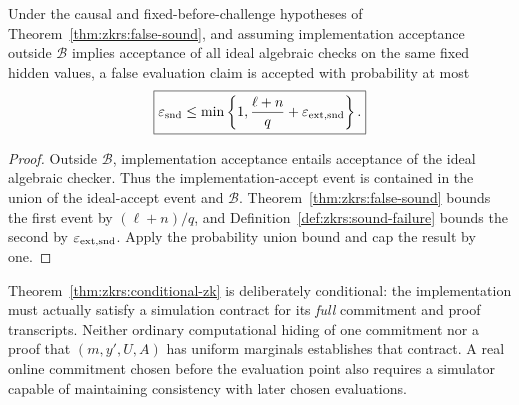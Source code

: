 \begin{theorem}\label{thm:zkrs:conditional-sound}
Under the causal and fixed-before-challenge hypotheses
of Theorem~\ref{thm:zkrs:false-sound},
and assuming implementation acceptance
outside $\mathcal B$ implies acceptance of all ideal
algebraic checks on the same fixed hidden values, a false
evaluation claim is accepted with probability at most
\[
 \boxed{
 \varepsilon_{\rm snd}\leq
 \min\left\{1,\frac{\ell+n}{q}
             +\varepsilon_{\rm ext,snd}\right\}.
 }
\]
\end{theorem}
\begin{proof}
Outside $\mathcal B$, implementation
acceptance entails acceptance of the
ideal algebraic checker.
Thus the implementation-accept event
is contained in the union of the
ideal-accept event and $\mathcal B$.
Theorem~\ref{thm:zkrs:false-sound}
bounds the first event by
$(\ell+n)/q$, and
Definition~\ref{def:zkrs:sound-failure}
bounds the second by
$\varepsilon_{\rm ext,snd}$.
Apply the probability union bound
and cap the result by one.
\end{proof}

\begin{remark}
Theorem~\ref{thm:zkrs:conditional-zk}
is deliberately conditional:
the implementation must actually
satisfy a simulation contract for
its \emph{full} commitment and proof
transcripts. Neither ordinary
computational hiding of one commitment
nor a proof that $(m,y',U,A)$ has
uniform marginals establishes that
contract. A real online commitment
chosen before the evaluation point
also requires a simulator capable of
maintaining consistency with later
chosen evaluations.
\end{remark}

